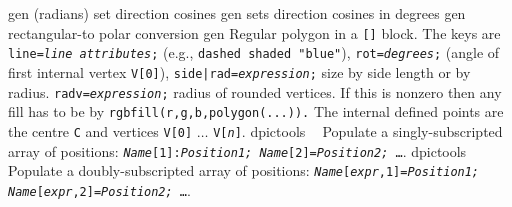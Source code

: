   {gen}%
  {(radians) set direction cosines}%
%
  {gen}%
  {sets direction cosines in degrees }%
%
  {gen}%
  {rectangular-to polar conversion}%
%
  {gen}%
  {Regular polygon in a {\tt []} block. The keys are
    {\tt line={\sl line attributes};} (e.g., {\tt dashed shaded "blue"}),
    {\tt rot={\sl degrees};} (angle of first internal vertex {\tt V[0]}),
    {\tt side|rad={\sl expression};} size by side length or by radius.
    {\tt radv={\sl expression};} radius of rounded vertices. If this is
    nonzero then any fill has to be by {\tt rgbfill(r,g,b,polygon(...)).}
   The internal defined points are the centre {\tt C} and vertices
   {\tt V[0]} $\ldots$ {\tt V[{\sl n}]}. }%
%
  {dpictools}%
  {$\;\;$  Populate a singly-subscripted array of positions:
    {\tt {\sl Name}[1]:{\sl Position1;}
         {\sl Name}[2]={\sl Position2;} \ldots}.}%
%
  {dpictools}%
  {$\;\;$  Populate a doubly-subscripted array of positions:
    {\tt {\sl Name}[{\sl expr},1]={\sl Position1;}
         {\sl Name}[{\sl expr},2]={\sl Position2;} \ldots}.}%


